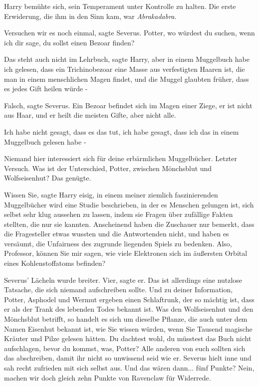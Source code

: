 Harry bemühte sich, sein Temperament unter Kontrolle zu halten. Die erste
Erwiderung, die ihm in den Sinn kam, war \glqq{}\emph{Abrakadabra}\grqq{}.

\glqq{}Versuchen wir es noch einmal\grqq{}, sagte Severus. \glqq{}Potter, wo
würdest du suchen, wenn ich dir sage, du sollst einen Bezoar finden?\grqq{}

\glqq{}Das steht auch nicht im Lehrbuch\grqq{}, sagte Harry, \glqq{}aber in einem
Muggelbuch habe ich gelesen, dass ein Trichinobezoar eine Masse aus verfestigten
Haaren ist, die man in einem menschlichen Magen findet, und die Muggel glaubten
früher, dass es jedes Gift heilen würde -\grqq{}

\glqq{}Falsch\grqq{}, sagte Severus. \glqq{}Ein Bezoar befindet sich im Magen
einer Ziege, er ist nicht aus Haar, und er heilt die meisten Gifte, aber nicht
alle.\grqq{}

\glqq{}Ich habe nicht gesagt, dass es das tut, ich habe gesagt, dass ich das in
einem Muggelbuch gelesen habe -\grqq{}

\glqq{}Niemand hier interessiert sich für deine erbärmlichen Muggelbücher.
Letzter Versuch. Was ist der Unterschied, Potter, zwischen Mönchsblut und
Wolfseisenhut?\grqq{} Das genügte.

\glqq{}Wissen Sie\grqq{}, sagte Harry eisig, \glqq{}in einem meiner ziemlich
faszinierenden Muggelbücher wird eine Studie beschrieben, in der es Menschen
gelungen ist, sich selbst sehr klug aussehen zu lassen, indem sie Fragen über
zufällige Fakten stellten, die nur sie kannten. Anscheinend haben die Zuschauer
nur bemerkt, dass die Fragesteller etwas wussten und die Antwortenden nicht, und
haben es versäumt, die Unfairness des zugrunde liegenden Spiels zu bedenken.
Also, Professor, können Sie mir sagen, wie viele Elektronen sich im äußersten
Orbital eines Kohlenstoffatoms befinden?\grqq{}

Severus' Lächeln wurde breiter. \glqq{}Vier\grqq{}, sagte er. \glqq{}Das ist
allerdings eine nutzlose Tatsache, die sich niemand aufschreiben sollte. Und zu
deiner Information, Potter, Asphodel und Wermut ergeben einen Schlaftrunk, der
so mächtig ist, dass er als der Trank des lebenden Todes bekannt ist. Was den
Wolfseisenhut und den Mönchsblut betrifft, so handelt es sich um dieselbe
Pflanze, die auch unter dem Namen Eisenhut bekannt ist, wie Sie wissen würden,
wenn Sie Tausend magische Kräuter und Pilze gelesen hätten. Du dachtest wohl, du
müsstest das Buch nicht aufschlagen, bevor du kommst, was, Potter? Alle anderen
von euch sollten sich das abschreiben, damit ihr nicht so unwissend seid wie
er.\grqq{} Severus hielt inne und sah recht zufrieden mit sich selbst aus. \glqq{}
Und das wären dann... fünf Punkte? Nein, machen wir doch gleich zehn Punkte von
Ravenclaw für Widerrede.\grqq{}

